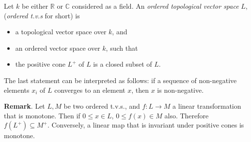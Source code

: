\documentclass[12pt]{article}
\begin{document}
Let $k$ be either $\mathbb{R}$ or $\mathbb{C}$ considered as a field.  An \emph{ordered topological vector space} $L$, (\emph{ordered t.v.s} for short) is 
\begin{itemize}
\item a topological vector space over $k$, and 
\item an ordered vector space over $k$, such that 
\item the positive cone $L^+$ of $L$ is a closed subset of $L$.
\end{itemize}

The last statement can be interpreted as follows: if a sequence of non-negative elements $x_i$ of $L$ converges to an element $x$, then $x$ is non-negative.

\textbf{Remark}.  Let $L,M$ be two ordered t.v.s., and $f:L\to M$ a linear transformation that is monotone.  Then if $0\le x\in L$, $0\le f(x)\in M$ also.  Therefore $f(L^+)\subseteq M^+$.  Conversely, a linear map that is invariant under positive cones is monotone.
\end{document}
